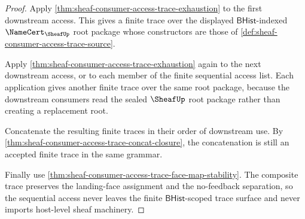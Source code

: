 \begin{proof}
Apply \autoref{thm:sheaf-consumer-access-trace-exhaustion} to the first downstream access. This gives a finite trace over the displayed $\mathsf{BHist}$-indexed $\NameCert_{\SheafUp}$ root package whose constructors are those of \autoref{def:sheaf-consumer-access-trace-source}.

Apply \autoref{thm:sheaf-consumer-access-trace-exhaustion} again to the next downstream access, or to each member of the finite sequential access list. Each application gives another finite trace over the same root package, because the downstream consumers read the sealed $\SheafUp$ root package rather than creating a replacement root.

Concatenate the resulting finite traces in their order of downstream use. By \autoref{thm:sheaf-consumer-access-trace-concat-closure}, the concatenation is still an accepted finite trace in the same grammar.

Finally use \autoref{thm:sheaf-consumer-access-trace-face-map-stability}. The composite trace preserves the landing-face assignment and the no-feedback separation, so the sequential access never leaves the finite $\mathsf{BHist}$-scoped trace surface and never imports host-level sheaf machinery.
\end{proof}
